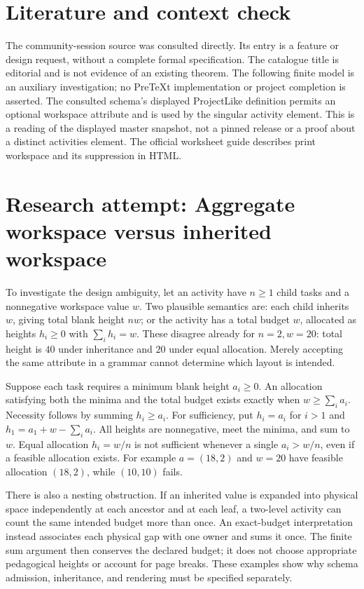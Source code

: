 \documentclass[11pt]{article}
\begin{document}
\section{Literature and context check}
The community-session source was consulted directly. Its entry is a feature or design request, without a complete formal specification. The catalogue title is editorial and is not evidence of an existing theorem. The following finite model is an auxiliary investigation; no PreTeXt implementation or project completion is asserted. The consulted schema's displayed ProjectLike definition permits an optional workspace attribute and is used by the singular activity element. This is a reading of the displayed master snapshot, not a pinned release or a proof about a distinct activities element. The official worksheet guide describes print workspace and its suppression in HTML.
\section{Research attempt: Aggregate workspace versus inherited workspace}
To investigate the design ambiguity, let an activity have $n\ge1$ child tasks and a nonnegative workspace value $w$. Two plausible semantics are: each child inherits $w$, giving total blank height $nw$; or the activity has a total budget $w$, allocated as heights $h_i\ge0$ with $\sum_i h_i=w$. These disagree already for $n=2,w=20$: total height is $40$ under inheritance and $20$ under equal allocation. Merely accepting the same attribute in a grammar cannot determine which layout is intended.

Suppose each task requires a minimum blank height $a_i\ge0$. An allocation satisfying both the minima and the total budget exists exactly when $w\ge\sum_i a_i$. Necessity follows by summing $h_i\ge a_i$. For sufficiency, put $h_i=a_i$ for $i>1$ and $h_1=a_1+w-\sum_i a_i$. All heights are nonnegative, meet the minima, and sum to $w$. Equal allocation $h_i=w/n$ is not sufficient whenever a single $a_i>w/n$, even if a feasible allocation exists. For example $a=(18,2)$ and $w=20$ have feasible allocation $(18,2)$, while $(10,10)$ fails.

There is also a nesting obstruction. If an inherited value is expanded into physical space independently at each ancestor and at each leaf, a two-level activity can count the same intended budget more than once. An exact-budget interpretation instead associates each physical gap with one owner and sums it once. The finite sum argument then conserves the declared budget; it does not choose appropriate pedagogical heights or account for page breaks. These examples show why schema admission, inheritance, and rendering must be specified separately.
\end{document}
